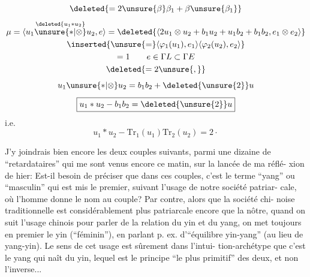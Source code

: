 \[\deleted{=2\unsure{\beta}\beta_1+\beta\unsure{\beta_1}}\]
\[
\begin{gathered}
\mu=\langle\overset{\deleted{u_1\ast u_2}}{u_1\unsure{\ast|\otimes}u_2},e\rangle
=\deleted{\langle2u_1\otimes u_2+b_1u_2+u_1b_2+b_1b_2,e_1\otimes e_2\rangle}\\
\inserted{\unsure{=}\langle\varphi_1(u_1),e_1\rangle\langle\varphi_2(u_2),e_2\rangle}\\
=1\qquad e\in\Gamma L\subset\Gamma E\\
\deleted{=2\unsure{,}}
\end{gathered}
\]
\[u_1\unsure{\ast|\otimes}u_2=b_1b_2+\deleted{\unsure{2}}u\]
\[\boxed{u_1\ast u_2-b_1b_2=\deleted{\unsure{2}}u}\]
i.e.
\[u_1\ast u_2-\mathrm{Tr}_1(u_1)\mathrm{Tr}_2(u_2)=2\cdot\]

J'y joindrais bien encore les deux couples suivants, parmi une dizaine de
``retardataires'' qui me sont venus encore ce matin, sur la lancée de ma réflé-
xion de hier:
Est-il besoin de préciser que dans ces couples, c'est le terme ``yang''
ou ``masculin'' qui est mis le premier, suivant l'usage de notre société patriar-
cale, où l'homme donne le nom au couple? Par contre, alors que la société chi-
noise traditionnelle est considérablement plus patriarcale encore que la nôtre,
quand on suit l'usage chinois pour parler de la relation du yin et du yang,
on met toujours en premier le yin (``féminin''), en parlant p. ex. d'``équilibre
yin-yang'' (au lieu de yang-yin). Le sens de cet usage est sûrement dans l'intui-
tion-archétype que c'est le yang qui naît du yin, lequel est le principe ``le
plus primitif'' des deux, et non l'inverse...

